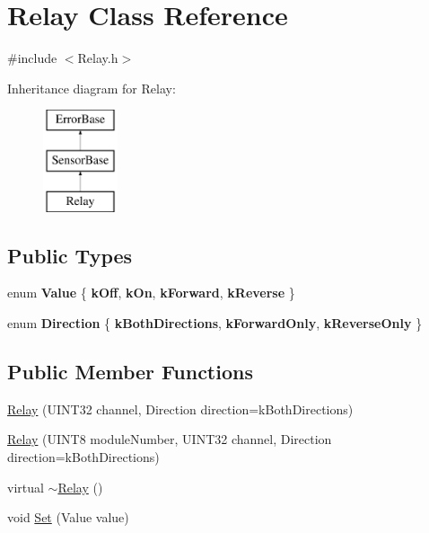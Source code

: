 \hypertarget{classRelay}{
\section{Relay Class Reference}
\label{classRelay}
}


{\ttfamily \#include $<$Relay.h$>$}

Inheritance diagram for Relay:\begin{figure}[H]
\begin{center}
\leavevmode
\includegraphics[height=3.000000cm]{classRelay}
\end{center}
\end{figure}
\subsection*{Public Types}
\begin{DoxyCompactItemize}
\item 
enum {\bfseries Value} \{ {\bfseries kOff}, 
{\bfseries kOn}, 
{\bfseries kForward}, 
{\bfseries kReverse}
 \}
\item 
enum {\bfseries Direction} \{ {\bfseries kBothDirections}, 
{\bfseries kForwardOnly}, 
{\bfseries kReverseOnly}
 \}
\end{DoxyCompactItemize}
\subsection*{Public Member Functions}
\begin{DoxyCompactItemize}
\item 
\hyperlink{classRelay_a25a4796fc9a4e52948c72d4885784764}{Relay} (UINT32 channel, Direction direction=kBothDirections)
\item 
\hyperlink{classRelay_accd81d4edb6ec1b0d7f967238834de5f}{Relay} (UINT8 moduleNumber, UINT32 channel, Direction direction=kBothDirections)
\item 
virtual \hyperlink{classRelay_a858c668bc7e353db53ed07b1a4ef1dbd}{$\sim$Relay} ()
\item 
void \hyperlink{classRelay_a35d0aa67e99f6ed89ccaa489a4275a31}{Set} (Value value)
\end{DoxyCompactItemize}


